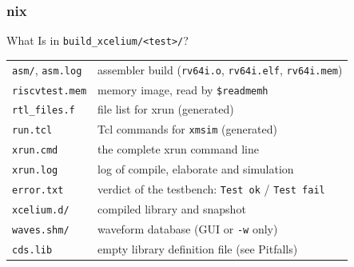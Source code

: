 \documentclass{beamer}
\newcommand{\astitle}{nix}
\newcommand{\assubtitle}{nix}
\newcommand{\cmd}[1]{\texttt{#1}}
\begin{document}
\renewcommand{\assubtitle}{What Is in \texttt{build\_xcelium/<test>/}?}
\begin{frame}
\frametitle{\astitle}
\begin{block}{\assubtitle}
  \footnotesize
  \begin{tabularx}{\linewidth}{@{}lY@{}}
    \cmd{asm/}, \cmd{asm.log}  & assembler build (\cmd{rv64i.o}, \cmd{rv64i.elf}, \cmd{rv64i.mem})\\[2pt]
    \cmd{riscvtest.mem}        & memory image, read by \cmd{\$readmemh}\\[2pt]
    \cmd{rtl\_files.f}         & file list for xrun (generated)\\[2pt]
    \cmd{run.tcl}              & Tcl commands for \cmd{xmsim} (generated)\\[2pt]
    \cmd{xrun.cmd}             & the complete xrun command line\\[2pt]
    \cmd{xrun.log}             & log of compile, elaborate and simulation\\[2pt]
    \cmd{error.txt}            & verdict of the testbench: \cmd{Test ok} / \cmd{Test fail}\\[2pt]
    \cmd{xcelium.d/}           & compiled library and snapshot\\[2pt]
    \cmd{waves.shm/}           & waveform database (GUI or \cmd{-w} only)\\[2pt]
    \cmd{cds.lib}              & empty library definition file (see Pitfalls)\\
  \end{tabularx}
\end{block}
\end{frame}
\end{document}

